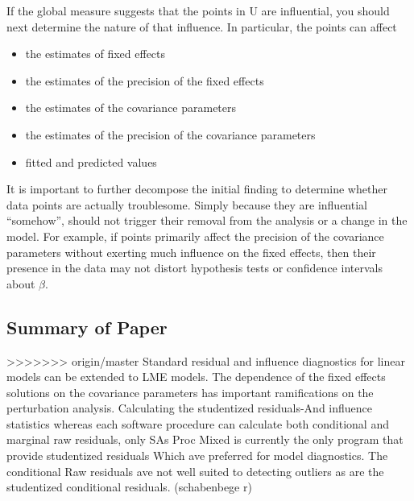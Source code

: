 \documentclass[12pt, a4paper]{report}
\theoremstyle{plain}
\theoremstyle{definition}
\theoremstyle{remark}
\begin{document}
If the global measure suggests that the points in U are influential, you should next determine the nature of
that influence. In particular, the points can affect
\begin{itemize}
	\item the estimates of fixed effects
	\item the estimates of the precision of the fixed effects
	\item the estimates of the covariance parameters
	\item the estimates of the precision of the covariance parameters
	\item fitted and predicted values
\end{itemize}

It is important to further decompose the initial finding to determine whether data points are actually troublesome.
Simply because they are influential “somehow”, should not trigger their removal from the analysis or
a change in the model. For example, if points primarily affect the precision of the covariance parameters
without exerting much influence on the fixed effects, then their presence in the data may not distort hypothesis
tests or confidence intervals about $\beta$.

\subsection{Summary of Paper}
>>>>>>> origin/master
Standard residual and influence diagnostics for linear models can be extended to LME models.
The dependence of the fixed effects solutions on the covariance parameters has important ramifications on the perturbation analysis.	
Calculating the studentized residuals-And influence statistics whereas each software procedure can calculate both conditional and marginal raw residuals, only SAs Proc Mixed is currently the only program that provide studentized residuals Which ave preferred for model diagnostics. The conditional Raw residuals ave not well suited to detecting outliers as are the studentized conditional residuals. (schabenbege r)
\end{document}

